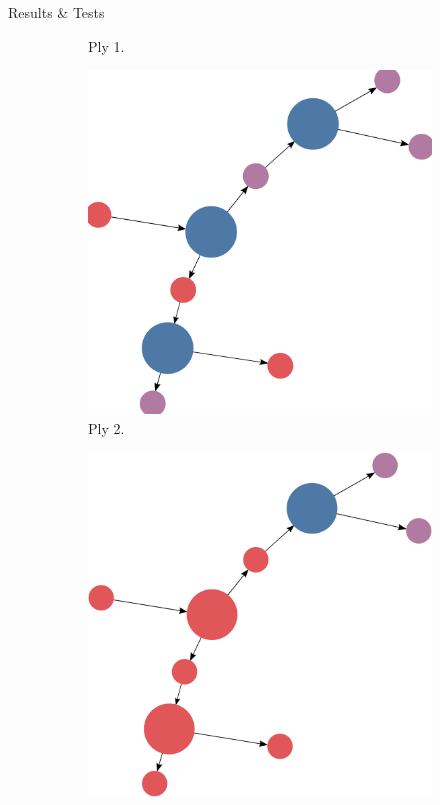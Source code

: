 \documentclass[final]{beamer} %
\begin{document}
\begin{frame}
\begin{columns}
\begin{column}{.33\textwidth}
{\begin{block}{Results \& Tests}
\begin{figure}[!htb]
\begin{subfigure}[!htb]{0.19\columnwidth}
							\caption{Ply 1.}
						\end{subfigure}
						\begin{subfigure}[!htb]{0.19\columnwidth}
							\centering
							\includegraphics[width=\columnwidth]{figures/knn_simple_lambda_think_2.pdf}
							\caption{Ply 2.}
						\end{subfigure}
						\begin{subfigure}[!htb]{0.19\columnwidth}
							\centering
							\includegraphics[width=\columnwidth]{figures/knn_simple_lambda_think_3.pdf}

\end{subfigure}
\end{figure}
\end{block}}
\end{column}
\end{columns}
\end{frame}
\end{document}
